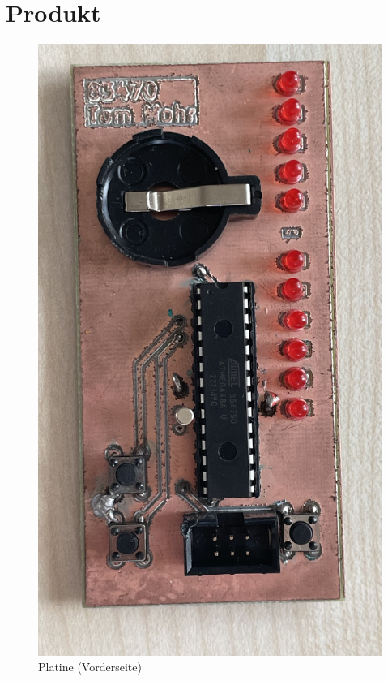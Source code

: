 	\chapter{Produkt}
		\begin{figure}[H]
			\centering
			\includegraphics[height=0.8\textheight]{platine_top}
			\caption{Platine (Vorderseite)}
			\label{fig:product-top}
		\end{figure}

